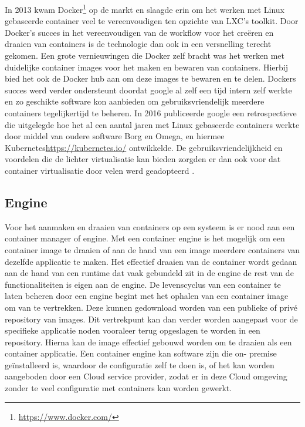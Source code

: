 In 2013 kwam Docker\footnote{\url{https://www.docker.com/}} op de markt en slaagde erin om het werken met Linux gebaseerde container veel te vereenvoudigen ten opzichte van LXC’s toolkit. Door Docker’s succes in het vereenvoudigen van de workflow voor het creëren en draaien van containers is de technologie dan ook in een versnelling terecht gekomen.  Een grote vernieuwingen die Docker zelf bracht was het werken met duidelijke container images voor het maken en bewaren van containers. Hierbij bied het ook de Docker hub aan om deze images te bewaren en te delen. Dockers succes werd verder ondersteunt doordat google  al zelf een tijd intern zelf werkte en zo geschikte software kon aanbieden om gebruiksvriendelijk  meerdere containers tegelijkertijd te beheren. In 2016 publiceerde google een retrospectieve die uitgelegde hoe het al een aantal jaren met Linux gebaseerde containers werkte door middel van oudere software Borg en Omega, en hiermee Kubernetes{\url{https://kubernetes.io/}} ontwikkelde. De gebruiksvriendelijkheid en voordelen die de lichter virtualisatie kan bieden zorgden er dan ook voor dat container virtualisatie door velen werd geadopteerd \autocite{Eder2016}.

\subsection{Engine}

Voor het aanmaken en draaien van containers op een systeem is er nood aan een container manager of engine. Met een container engine is het mogelijk om een container image te draaien of aan de hand van een image meerdere containers van dezelfde applicatie te maken. Het effectief draaien van de container wordt gedaan aan de hand van een runtime dat vaak gebundeld zit in de engine de rest van de functionaliteiten is eigen aan de engine. De levenscyclus van een container te laten beheren door een engine begint met het ophalen van een container image om van te vertrekken. Deze kunnen gedownload worden van een publieke of privé repository van images. Dit vertrekpunt kan dan verder worden aangepast voor de specifieke applicatie noden vooraleer terug opgeslagen te worden in een repository. Hierna kan de image effectief gebouwd worden om te draaien als een container applicatie. Een container engine kan software zijn die on- premise geïnstalleerd is, waardoor de configuratie zelf te doen is, of het kan worden aangeboden door een Cloud service provider, zodat er in deze Cloud omgeving zonder te veel configuratie met containers kan worden gewerkt\autocite{Casalicchio2020}.

